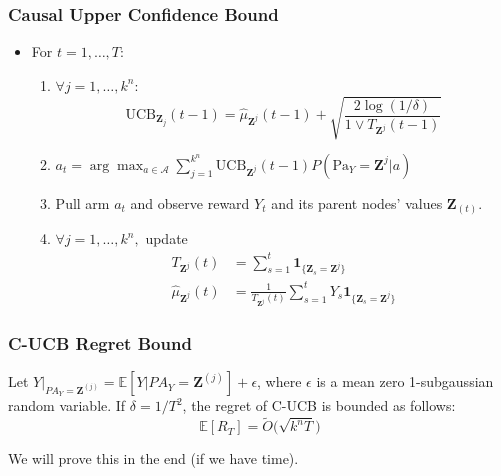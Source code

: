 \documentclass{beamer}
\newcommand{\E}{{\mathbb {E}}}
\newcommand{\bZ}{{\mathbf{Z}}}
\begin{document}
\begin{frame}
\frametitle{Causal Upper Confidence Bound}
\begin{itemize}
\item[]  For $t=1,\ldots,T$:
\vspace{0.2cm}

		\begin{enumerate}
			\item $\forall j=1,\ldots,k^n$: 
			$$\text{UCB}_{\mathbf{Z}_j}(t-1) = \hat{\mu}_{\mathbf{Z}^j}(t-1)+\sqrt{\frac{2\log(1/\delta)}{1\vee T_{\mathbf{Z}^j}(t-1)}}$$
			\item $a_t = \arg\max_{a\in\mathcal{A}} \sum_{j=1}^{k^n}\text{UCB}_{\mathbf{Z}^j}(t-1)P(\text{Pa}_Y=\mathbf{Z}^j|a)$	
			\vspace{0.2cm}
			\item Pull arm $a_t$ and observe reward $Y_t$ and its parent nodes' values $\mathbf{Z}_{(t)}$.
			\vspace{0.2cm}
			\item $\forall j=1,\ldots,k^n, $ update 
			\begin{align*}
				T_{\mathbf{Z}^j}(t) &= \sum_{s=1}^{t} \mathbf{1}_{\{\mathbf{Z}_{s}=\mathbf{Z}^j\}}\\
				\hat{\mu}_{\mathbf{Z}^j}(t) &= \frac{1}{T_{\mathbf{Z}^j}(t)}\sum_{s=1}^{t}Y_s\mathbf{1}_{\{\mathbf{Z}_{s}=\mathbf{Z}^j\}}
			\end{align*}			
		\end{enumerate}
\end{itemize}
\end{frame}


\begin{frame}
	\frametitle{C-UCB Regret Bound}
	
	\begin{theorem}
		Let $Y|_{PA_Y = \bZ^{(j)}} = \E[Y|PA_Y = \bZ^{(j)}] + \epsilon$, where $\epsilon$ is a mean zero 1-subgaussian random variable. If $\delta = 1/T^2$, the regret of C-UCB is bounded as follows:
		\begin{equation}
			\E[R_T] = \tilde{O}\Big(\sqrt{k^n T}\Big)
		\end{equation}	
	\end{theorem}
	
	We will prove this in the end (if we have time).
\end{frame}
\end{document}
